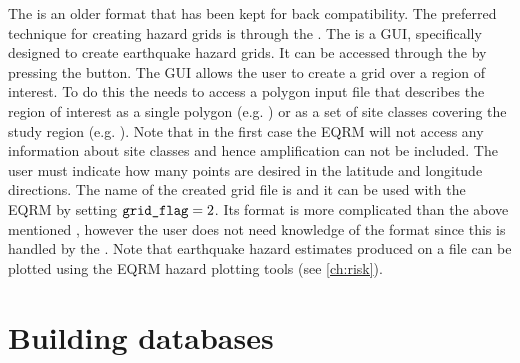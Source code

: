The  is an older
format that has been kept for back compatibility. The preferred
technique for creating hazard grids is through the \typeim. The
\typeim is a GUI, specifically designed to create earthquake
hazard grids. It can be accessed through the
 by pressing the \typeim button.
The \typeim GUI allows the user to create a grid over a region of
interest. To do this the \typeim needs to access a polygon input
file that describes the region of interest as a single polygon
(e.g. ) or
as a set of site classes covering the study region (e.g.
). Note that
in the first case the EQRM will not access any information about
site classes and hence amplification can not be included. The user
must indicate how many points are desired in the latitude and
longitude directions. The name of the created grid file is
 and it can
be used with the EQRM by setting $\typepar{grid}{\_}{flag}=2$. Its
format is more complicated than the above mentioned
, however the user
does not need knowledge of the format since this is handled by the
\typeim. Note that earthquake hazard estimates produced on a
 file can
be plotted using the EQRM hazard plotting tools (see
\cref{ch:risk}).

\section{Building databases}
\label{sec:grids-bdatabase}

